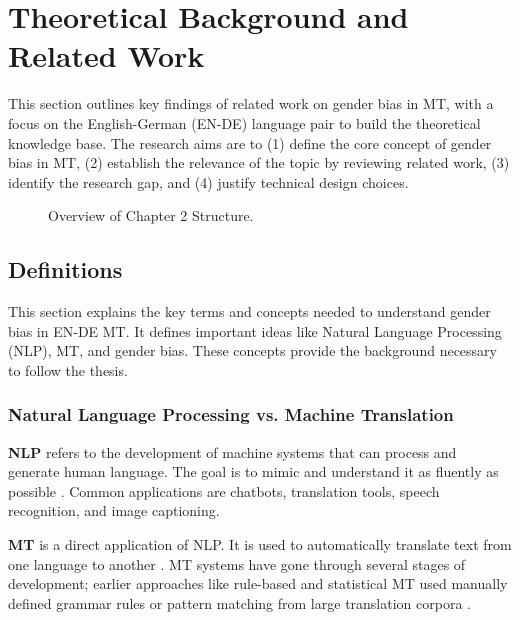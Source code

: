 \chapter{Theoretical Background and Related Work}
This section outlines key findings of related work on gender bias in MT, with a focus on the English-German (EN-DE) language pair to build the theoretical knowledge base. The research aims are to (1) define the core concept of gender bias in MT, (2) establish the relevance of the topic by reviewing related work, (3) identify the research gap, and (4) justify technical design choices. 

\vspace{1cm} 
\begin{figure}[htb]
    \centering
    \scalebox{0.8}{}
    \caption{Overview of Chapter 2 Structure.}
    \label{fig:workflow_theory}
\end{figure}
\vspace{1cm} 


\section{Definitions}
This section explains the key terms and concepts needed to understand gender bias in EN-DE MT. It defines important ideas like Natural Language Processing (NLP), MT, and gender bias. These concepts provide the background necessary to follow the thesis.

\subsection{Natural Language Processing vs. Machine Translation}
    \textbf{NLP} refers to the development of machine systems that can process and generate human language. The goal is to mimic and understand it as fluently as possible \citep{smacchiaDoesAIReflect2024,ullmannGenderBiasMachine2022}. Common applications are chatbots, translation tools, speech recognition, and image captioning.

    \textbf{MT} is a direct application of NLP. It is used to automatically translate text from one language to another \citep{linMachineTranslationAcademic2009}. MT systems have gone through several stages of development; earlier approaches like rule-based and statistical MT used manually defined grammar rules or pattern matching from large translation corpora \citep{chakravarthiSurveyOrthographicInformation2021}. 

